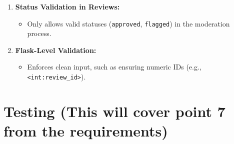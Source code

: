 \documentclass[a4paper,12pt]{article}
\begin{document}
\begin{enumerate}
    \item \textbf{Status Validation in Reviews:}
    \begin{itemize}
        \item Only allows valid statuses (\texttt{approved}, \texttt{flagged}) in the moderation process.
    \end{itemize}

    \item \textbf{Flask-Level Validation:}
    \begin{itemize}
        \item Enforces clean input, such as ensuring numeric IDs (e.g., \texttt{<int:review\_id>}).
    \end{itemize}
\end{enumerate}

\section{Testing (This will cover point 7 from the requirements)}
\end{document}

